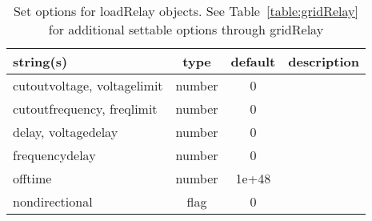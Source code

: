 \begin{table}[ht]
\centering
\begin{tabular}{p{5cm} c c p{7cm}}
\hline
string(s) & type & default & description \\
\hline
cutoutvoltage, voltagelimit & number & 0 & \\
cutoutfrequency, freqlimit & number & 0 & \\
delay, voltagedelay & number & 0 & \\
frequencydelay & number & 0 & \\
offtime & number & 1e+48 & \\
nondirectional & flag & 0 & \\
\hline
\end{tabular}
\caption{Set options for loadRelay objects. See Table~\ref{table:gridRelay} for additional settable options through gridRelay}
\label{table:loadRelay}
\end{table}
